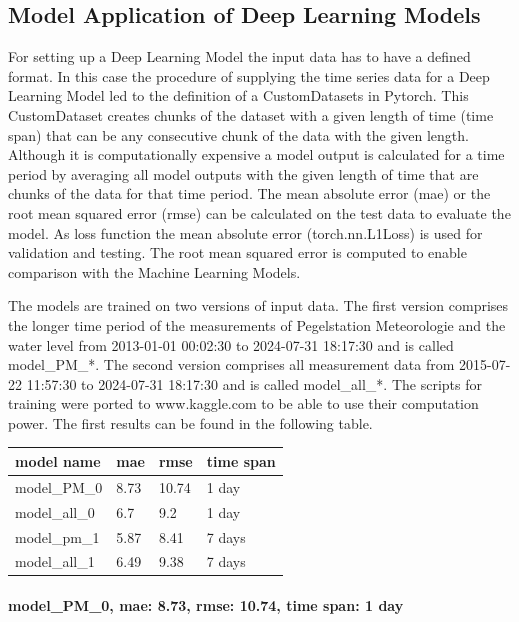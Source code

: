 \documentclass[a4paper,12pt]{article}
\begin{document}
\subsection{Model Application of Deep Learning Models}
For setting up a Deep Learning Model the input data has to have a defined format. In this case the procedure of supplying the time series data for a Deep Learning Model led to the definition of a CustomDatasets in Pytorch. This CustomDataset creates chunks of the dataset with a given length of time (time span) that can be any consecutive chunk of the data with the given length. Although it is computationally expensive a model output is calculated for a time period by averaging all model outputs with the given length of time that are chunks of the data for that time period. The mean absolute error (mae) or the root mean squared error (rmse) can be calculated on the test data to evaluate the model. As loss function the mean absolute error (torch.nn.L1Loss) is used for validation and testing. The root mean squared error is computed to enable comparison with the Machine Learning Models.

The models are trained on two versions of input data. The first version comprises the longer time period of the measurements of Pegelstation Meteorologie and the water level from 2013-01-01 00:02:30 to 2024-07-31 18:17:30 and is called model\_PM\_*. The second version comprises all measurement data from 2015-07-22 11:57:30 to 2024-07-31 18:17:30 and is called model\_all\_*. The scripts for training were ported to www.kaggle.com to be able to use their computation power. The first results can be found in the following table.

\begin{table}[H]
\begin{tabular}{llll}
model name & mae & rmse & time span \\
\hline
model\_PM\_0 & 8.73 & 10.74 & 1 day \\
model\_all\_0 & 6.7 & 9.2 & 1 day \\
model\_pm\_1 & 5.87 & 8.41 & 7 days \\
model\_all\_1 & 6.49 & 9.38 & 7 days \\
\end{tabular}
\end{table}

\paragraph{model\_PM\_0, mae: 8.73, rmse: 10.74, time span: 1 day}
\end{document}
